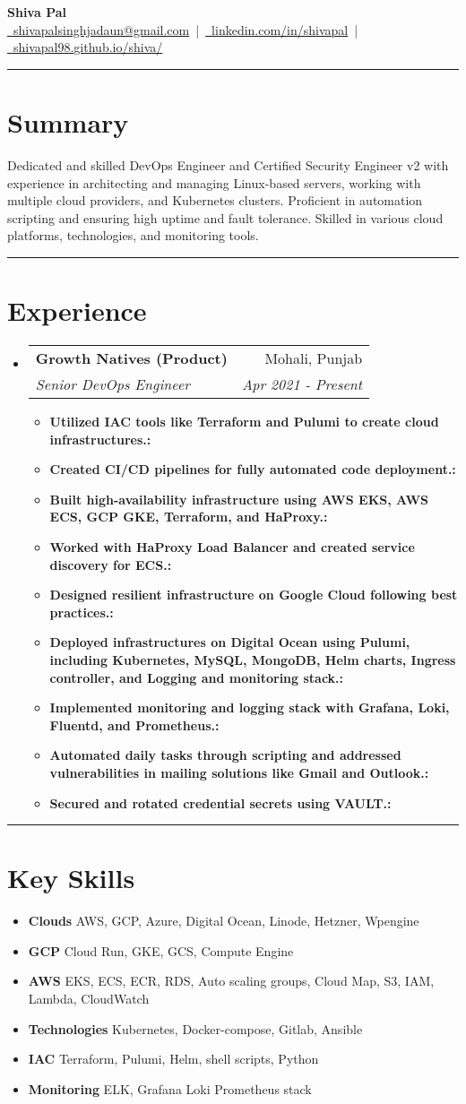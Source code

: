 \documentclass[letterpaper,11pt]{article}
\makeatletter
\newcommand{\resumeSection}[1]{
    \vspace{10pt}
    {\color{darkblue}\hrule}
    \vspace{-5pt}
    \section*{#1}
}
\newcommand{\resumeItem}[2]{
    \item \textbf{#1:} #2
}
\newcommand{\resumeSubItem}[2]{
    \item \textbf{#1} #2
}
\newcommand{\resumeSubHeading}[4]{
    \vspace{-1pt}
    \item
    \begin{tabular*}{0.97\textwidth}[t]{l@{\extracolsep{\fill}}r}
        \textbf{#1} & #2 \\
        \textit{#3} & \textit{#4} \\
    \end{tabular*}
}
\makeatother
\begin{document}
\begin{center}
    \textbf{\Huge Shiva Pal}\\
    \href{mailto:shivapalsinghjadaun@gmail.com}{\faEnvelope\ shivapalsinghjadaun@gmail.com} \,|\, 
    \href{https://www.linkedin.com/in/shivapal/}{\faLinkedin\ linkedin.com/in/shivapal} \,|\, 
    \href{https://shivapal98.github.io/shiva/}{\faGlobe\ shivapal98.github.io/shiva/}
\end{center}

\resumeSection{Summary}
Dedicated and skilled DevOps Engineer and Certified Security Engineer v2 with experience in architecting and managing Linux-based servers, working with multiple cloud providers, and Kubernetes clusters. Proficient in automation scripting and ensuring high uptime and fault tolerance. Skilled in various cloud platforms, technologies, and monitoring tools.

\resumeSection{Experience}
\begin{itemize}[left=0pt]
    \resumeSubHeading{Growth Natives (Product)}{Mohali, Punjab}{Senior DevOps Engineer}{Apr 2021 - Present}
    \begin{itemize}
        \resumeItem{Utilized IAC tools like Terraform and Pulumi to create cloud infrastructures.}
        \resumeItem{Created CI/CD pipelines for fully automated code deployment.}
        \resumeItem{Built high-availability infrastructure using AWS EKS, AWS ECS, GCP GKE, Terraform, and HaProxy.}
        \resumeItem{Worked with HaProxy Load Balancer and created service discovery for ECS.}
        \resumeItem{Designed resilient infrastructure on Google Cloud following best practices.}
        \resumeItem{Deployed infrastructures on Digital Ocean using Pulumi, including Kubernetes, MySQL, MongoDB, Helm charts, Ingress controller, and Logging and monitoring stack.}
        \resumeItem{Implemented monitoring and logging stack with Grafana, Loki, Fluentd, and Prometheus.}
        \resumeItem{Automated daily tasks through scripting and addressed vulnerabilities in mailing solutions like Gmail and Outlook.}
        \resumeItem{Secured and rotated credential secrets using VAULT.}
    \end{itemize}
    
\end{itemize}

\resumeSection{Key Skills}
\begin{itemize}[left=0pt]
    \resumeSubItem{Clouds}{AWS, GCP, Azure, Digital Ocean, Linode, Hetzner, Wpengine}
    \resumeSubItem{GCP}{Cloud Run, GKE, GCS, Compute Engine}
    \resumeSubItem{AWS}{EKS, ECS, ECR, RDS, Auto scaling groups, Cloud Map, S3, IAM, Lambda, CloudWatch}
    \resumeSubItem{Technologies}{Kubernetes, Docker-compose, Gitlab, Ansible}
    \resumeSubItem{IAC}{Terraform, Pulumi, Helm, shell scripts, Python}
    \resumeSubItem{Monitoring}{ELK, Grafana Loki Prometheus stack}
\end{itemize}
\end{document}
